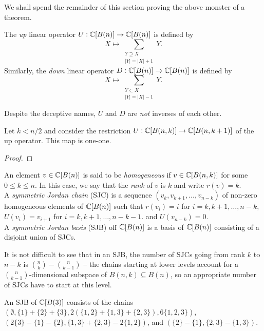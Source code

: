 	We shall spend the remainder of this section proving the above monster of a theorem.

	\begin{fdef}
		The \emph{up} linear operator $U : \mathbb{C}[B(n)] \to \mathbb{C}[B(n)]$ is defined by
		\[ X \mapsto \sum_{\substack{Y \supseteq X \\ |Y|=|X|+1}} Y. \]
		Similarly, the \emph{down} linear operator $D : \mathbb{C}[B(n)] \to \mathbb{C}[B(n)]$ is defined by
		\[ X \mapsto \sum_{\substack{Y \subset X \\ |Y|=|X|-1}} Y. \]
	\end{fdef}
	
	Despite the deceptive names, $U$ and $D$ are \emph{not} inverses of each other.

	\begin{flem}
		Let $k < n/2$ and consider the restriction $U : \mathbb{C}[B(n,k)] \to \mathbb{C}[B(n,k+1)]$ of the up operator. This map is one-one.
	\end{flem}
	\begin{proof}
		
	\end{proof}

	\begin{fdef}
		An element $v \in \mathbb{C}[B(n)]$ is said to be \emph{homogeneous} if $v \in \mathbb{C}[B(n,k)]$ for some $0 \le k \le n$. In this case, we say that the \emph{rank} of $v$ is $k$ and write $r(v) = k$.\\
		A \emph{symmetric Jordan chain} (SJC) is a sequence $(v_k,v_{k+1},\ldots,v_{n-k})$ of non-zero homogeneous elements of $\mathbb{C}[B(n)]$ such that $r(v_i) = i$ for $i = k,k+1,\ldots,n-k$, $U(v_i) = v_{i+1}$ for $i=k,k+1,\ldots,n-k-1$. and $U(v_{n-k}) = 0$.\\
		A \emph{symmetric Jordan basis} (SJB) off $\mathbb{C}[B(n)]$ is a basis of $\mathbb{C}[B(n)]$ consisting of a disjoint union of SJCs.
	\end{fdef}

	It is not difficult to see that in an SJB, the number of SJCs going from rank $k$ to $n-k$ is $\binom{n}{k}-\binom{n}{k-1}$ -- the chains starting at lower levels account for a $\binom{n}{k-1}$-dimensional subspace of $B(n,k) \subseteq B(n)$, so an appropriate number of SJCs have to start at this level.

	\begin{fex}
		An SJB of $\mathbb{C}[B(3)]$ consists of the chains $(\emptyset, \{1\}+\{2\}+\{3\}, 2(\{1,2\}+\{1,3\}+\{2,3\}), 6\{1,2,3\})$, $(2\{3\}-\{1\}-\{2\} , \{1,3\}+\{2,3\}-2\{1,2\})$, and $(\{2\}-\{1\} , \{2,3\} - \{1,3\})$.
	\end{fex}

